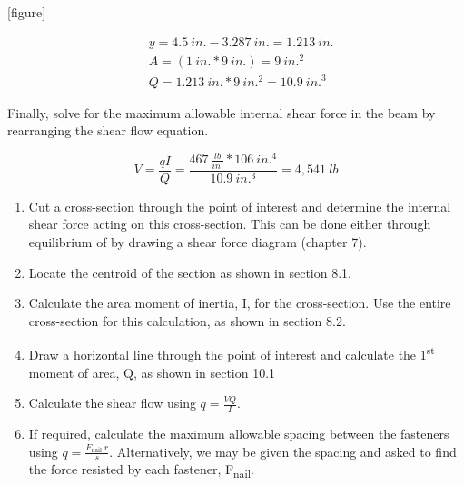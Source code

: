\documentclass[
  letterpaper,
  DIV=11,
  numbers=noendperiod]{scrreprt}
\providecommand{\tightlist}{%
  \setlength{\itemsep}{0pt}\setlength{\parskip}{0pt}}\usepackage{longtable,booktabs,array}
\begin{document}
\begin{tcolorbox}
\begin{tcolorbox}
{[}figure{]}

\[
\begin{aligned}
& y=4.5{~in.}-3.287{~in.}=1.213{~in.} \\
& A=(1{~in.} * 9{~in.})=9{~in.}^2 \\
& Q=1.213{~in.} * 9{~in.^2}=10.9{~in.}^3
\end{aligned}
\]

Finally, solve for the maximum allowable internal shear force in the
beam by rearranging the shear flow equation.

\[
V=\frac{q I}{Q}=\frac{467~\frac{lb}{in.} * 106{~in.^4}}{10.9{~in.^3}}=4,541{~lb}
\]

\end{tcolorbox}

\end{tcolorbox}

\begin{tcolorbox}[enhanced jigsaw, breakable, opacityback=0, toptitle=1mm, left=2mm, colback=white, opacitybacktitle=0.6, colframe=quarto-callout-warning-color-frame, titlerule=0mm, arc=.35mm, leftrule=.75mm, bottomtitle=1mm, colbacktitle=quarto-callout-warning-color!10!white, rightrule=.15mm, title={Step-by-step: Shear flow}, bottomrule=.15mm, toprule=.15mm, coltitle=black]

\begin{enumerate}
\def\labelenumi{\arabic{enumi}.}
\tightlist
\item
  Cut a cross-section through the point of interest and determine the
  internal shear force acting on this cross-section. This can be done
  either through equilibrium of by drawing a shear force diagram
  (chapter 7).
\item
  Locate the centroid of the section as shown in section 8.1.
\item
  Calculate the area moment of inertia, I, for the cross-section. Use
  the entire cross-section for this calculation, as shown in section
  8.2.
\item
  Draw a horizontal line through the point of interest and calculate the
  1\textsuperscript{st} moment of area, Q, as shown in section 10.1
\item
  Calculate the shear flow using \(q=\frac{V Q}{I}\).
\item
  If required, calculate the maximum allowable spacing between the
  fasteners using \(q=\frac{F_{\text {nail }} r}{s}\). Alternatively, we
  may be given the spacing and asked to find the force resisted by each
  fastener, F\textsubscript{nail}.
\end{enumerate}

\end{tcolorbox}
\end{document}
